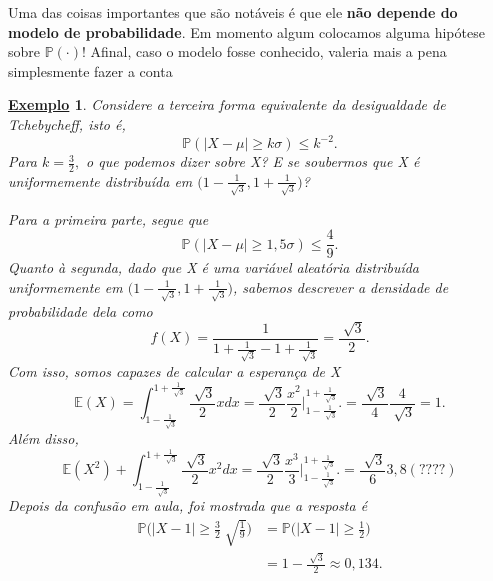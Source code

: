 \documentclass{article}
\newtheorem{example}{\underline{Exemplo}}
\begin{document}
  Uma das coisas importantes que são notáveis é que ele \textbf{não depende do modelo de probabilidade}. Em momento algum colocamos
alguma hipótese sobre \(\mathbb{P}(\cdot )\)! Afinal, caso o modelo fosse conhecido, valeria mais a pena simplesmente fazer a conta
\begin{example}
  Considere a terceira forma equivalente da desigualdade de Tchebycheff, isto é, 
  \[
    \mathbb{P}(|X-\mu|\geq k\sigma )\leq k^{-2}.
  \]
Para \(k=\frac{3}{2},\) o que podemos dizer sobre X? E se soubermos que X é uniformemente
distribuída em \(\biggl(1-\frac{1}{\sqrt[]{3}}, 1 + \frac{1}{\sqrt[]{3}}\biggr)\)?

  Para a primeira parte, segue que 
  \[
    \mathbb{P}(|X-\mu|\geq 1,5\sigma )\leq \frac{4}{9}.
  \] 
Quanto à segunda, dado que X é uma variável aleatória distribuída uniformemente em \(\biggl(1-\frac{1}{\sqrt[]{3}}, 1 + \frac{1}{\sqrt[]{3}}\biggr)\),
sabemos descrever a densidade de probabilidade dela como 
  \[
    f(X) = \frac{1}{1+\frac{1}{\sqrt[]{3}} - 1 + \frac{1}{\sqrt[]{3}}} = \frac{\sqrt[]{3}}{2}.
  \]
  Com isso, somos capazes de calcular a esperança de X 
  \[
    \mathbb{E}(X) = \int_{1-\frac{1}{\sqrt[]{3}}}^{1 + \frac{1}{\sqrt[]{3}}} \frac{\sqrt[]{3}}{2}xdx = \frac{\sqrt[]{3}}{2}\frac{x^{2}}{2}\biggl|_{1-\frac{1}{\sqrt[]{3}}}^{1+\frac{1}{\sqrt[]{3}}}\biggr. = \frac{\sqrt[]{3}}{4} \frac{4}{\sqrt[]{3}} = 1.
  \]
  Além disso, 
  \[
    \mathbb{E}(X^{2}) + \int_{1-\frac{1}{\sqrt[]{3}}}^{1 + \frac{1}{\sqrt[]{3}}} \frac{\sqrt[]{3}}{2}x^{2}dx = \frac{\sqrt[]{3}}{2}\frac{x^{3}}{3}\biggl|_{1-\frac{1}{\sqrt[]{3}}}^{1+\frac{1}{\sqrt[]{3}}}\biggr. = \frac{\sqrt[]{3}}{6}3,8 (????)
  \]
  Depois da confusão em aula, foi mostrada que a resposta é
 \begin{align*}
   \mathbb{P}\biggl(|X-1|\geq \frac{3}{2}\sqrt[]{\frac{1}{9}}\biggr) &= \mathbb{P}\biggl(|X-1|\geq \frac{1}{2}\biggr) \\
                                                                     &= 1 - \frac{\sqrt[]{3}}{2} \approx 0,134.
 \end{align*}

\end{example}
\end{document}
